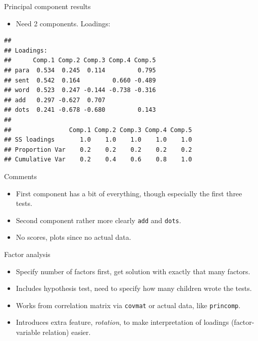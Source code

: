 \documentclass[
  ignorenonframetext,
]{beamer}
\newenvironment{Shaded}{\begin{snugshade}}{\end{snugshade}}
\newcommand{\NormalTok}[1]{#1}
\newcommand{\OperatorTok}[1]{\textcolor[rgb]{0.81,0.36,0.00}{\textbf{#1}}}
\providecommand{\tightlist}{%
  \setlength{\itemsep}{0pt}\setlength{\parskip}{0pt}}
\begin{document}
\begin{frame}[fragile]{Principal component results}
\protect\hypertarget{principal-component-results}{}

\begin{itemize}
\tightlist
\item
  Need 2 components. Loadings:
\end{itemize}

\footnotesize

\begin{Shaded}
\end{Shaded}

\begin{verbatim}
## 
## Loadings:
##      Comp.1 Comp.2 Comp.3 Comp.4 Comp.5
## para  0.534  0.245  0.114         0.795
## sent  0.542  0.164         0.660 -0.489
## word  0.523  0.247 -0.144 -0.738 -0.316
## add   0.297 -0.627  0.707              
## dots  0.241 -0.678 -0.680         0.143
## 
##                Comp.1 Comp.2 Comp.3 Comp.4 Comp.5
## SS loadings       1.0    1.0    1.0    1.0    1.0
## Proportion Var    0.2    0.2    0.2    0.2    0.2
## Cumulative Var    0.2    0.4    0.6    0.8    1.0
\end{verbatim}

\normalsize

\end{frame}

\begin{frame}[fragile]{Comments}
\protect\hypertarget{comments-34}{}

\begin{itemize}
\item
  First component has a bit of everything, though especially the first
  three tests.
\item
  Second component rather more clearly \texttt{add} and \texttt{dots}.
\item
  No scores, plots since no actual data.
\end{itemize}

\end{frame}

\begin{frame}[fragile]{Factor analysis}
\protect\hypertarget{factor-analysis}{}

\begin{itemize}
\item
  Specify number of factors first, get solution with exactly that many
  factors.
\item
  Includes hypothesis test, need to specify how many children wrote the
  tests.
\item
  Works from correlation matrix via \texttt{covmat} or actual data, like
  \texttt{princomp}.
\item
  Introduces extra feature, \emph{rotation}, to make interpretation of
  loadings (factor-variable relation) easier.
\end{itemize}

\end{frame}
\end{document}
